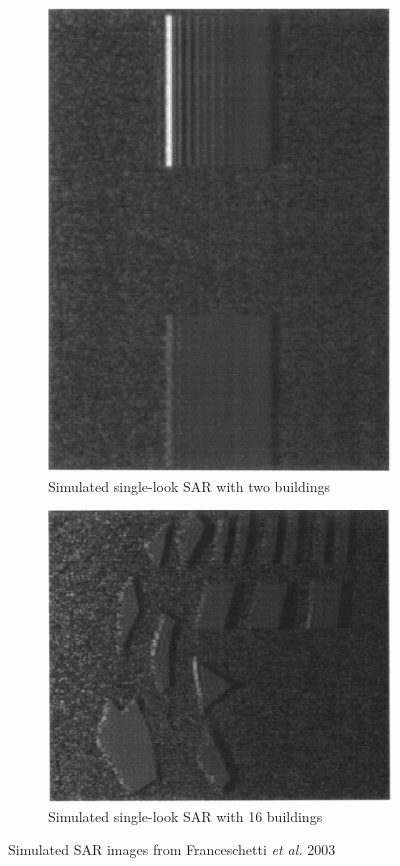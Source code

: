 \begin{figure}
\centering
\begin{subfigure}{.5\textwidth}
	\centering
	\includegraphics[width=0.45\linewidth]{../figures/franceschetti_2003_2_buildings}
	\caption{Simulated single-look SAR with two buildings}
	\label{fig:franceschetti_2003_2_buildings}
\end{subfigure}%
\begin{subfigure}{.5\textwidth}
	\centering
	\includegraphics[width=0.7\linewidth]{../figures/franceschetti_2003_16_buildings}	
	\caption{Simulated single-look SAR with 16 buildings}
	\label{fig:franceschetti_2003_16_buildings}
\end{subfigure}
\caption{Simulated SAR images from Franceschetti \textit{et al.} 2003 \cite{franceschettiSARRawSignal2003}}
\label{fig:franceschetti_2003_buildings}
	
\end{figure}

